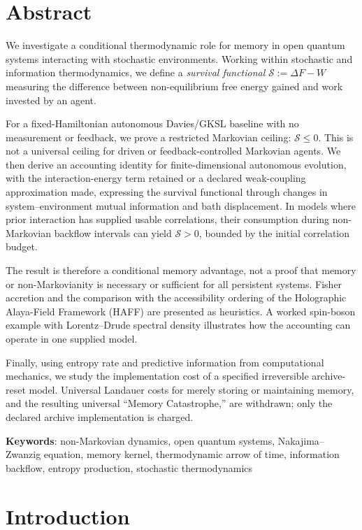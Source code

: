 \documentclass[12pt,a4paper,openany]{book}
\begin{document}
\bigskip

\section*{Abstract}
We investigate a conditional thermodynamic role for memory in open
quantum systems interacting with stochastic environments.  Working
within stochastic and information thermodynamics, we define a
\emph{survival functional} $\mathcal{S}:=\Delta F-W$ measuring the
difference between non-equilibrium free energy gained and work invested
by an agent.

For a fixed-Hamiltonian autonomous Davies/GKSL baseline with no
measurement or feedback, we prove a restricted Markovian ceiling:
$\mathcal{S}\leq0$.  This is not a universal ceiling for driven or
feedback-controlled Markovian agents.  We then derive an accounting
identity for finite-dimensional autonomous evolution, with the
interaction-energy term retained or a declared weak-coupling
approximation made, expressing the survival functional through changes
in system--environment mutual information and bath displacement.  In
models where prior interaction has supplied usable correlations, their
consumption during non-Markovian backflow intervals can yield
$\mathcal{S}>0$, bounded by the initial correlation budget.

The result is therefore a conditional memory advantage, not a proof that
memory or non-Markovianity is necessary or sufficient for all persistent
systems.  Fisher accretion and the comparison with the accessibility
ordering of the Holographic Alaya-Field Framework (HAFF) are presented
as heuristics.  A worked spin-boson example with Lorentz--Drude spectral
density illustrates how the accounting can operate in one supplied
model.

Finally, using entropy rate and predictive information from
computational mechanics, we study the implementation cost of a specified
irreversible archive-reset model.  Universal Landauer costs for merely
storing or maintaining memory, and the resulting universal ``Memory
Catastrophe,'' are withdrawn; only the declared archive implementation
is charged.

\medskip
\noindent\textbf{Keywords}: non-Markovian dynamics, open quantum systems,
Nakajima--Zwanzig equation, memory kernel, thermodynamic arrow of time,
information backflow, entropy production, stochastic thermodynamics


\section{Introduction}
\label{T-I-sec:intro}
\end{document}
